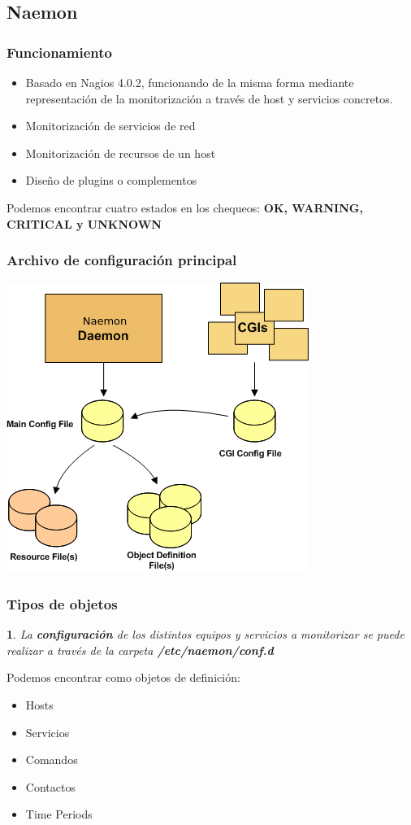 \documentclass{beamer}
\theoremstyle{plain}
\theoremstyle{definition}
\theoremstyle{plain}
\newtheorem{prop}[thm]{}
\theoremstyle{definition}
\theoremstyle{remark}
\theoremstyle{definition}
\begin{document}
\subsection{Naemon}
\begin{frame}
	\frametitle{Funcionamiento}
	\begin{itemize}
		\item Basado en Nagios 4.0.2, funcionando de la misma forma mediante representación de la monitorización a través de host y servicios concretos.
		\item Monitorización de servicios de red
		\item Monitorización de recursos de un host
		\item Diseño de plugins o complementos
	\end{itemize}
\begin{block}
	
	Podemos encontrar cuatro estados en los chequeos: \textbf{OK,
	WARNING, CRITICAL y UNKNOWN}
\end{block}
	
\end{frame}
\begin{frame}
	\frametitle{Archivo de configuración principal}
	\centering
	\includegraphics[scale=0.5]{imagenes/main_configuring.png}
		
\end{frame}

\begin{frame}
	\frametitle{Tipos de objetos}
	\begin{prop}
		La \textbf{configuración} de los distintos equipos y servicios a monitorizar se puede realizar a través de la carpeta \textbf{/etc/naemon/conf.d}
	\end{prop}
Podemos encontrar como objetos de definición:
\begin{itemize}
	\item Hosts
	\item Servicios
	\item Comandos
	\item Contactos
	\item Time Periods
\end{itemize}
	
\end{frame}
\end{document}
